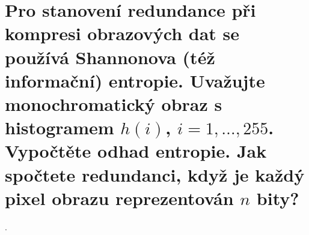 \section{Pro stanovení redundance při kompresi obrazových dat se používá Shannonova (též informační) entropie. Uvažujte 
monochromatický obraz s histogramem \texorpdfstring{$h(i)$}{h(i)}, \texorpdfstring{$i=1,\dots,255$}{i=1,\dots,255}. 
Vypočtěte odhad entropie. Jak spočtete redundanci, když je každý pixel obrazu reprezentován \texorpdfstring{$n$}{n} 
bity?}.